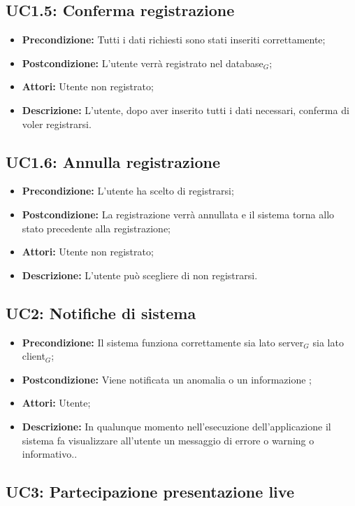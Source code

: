 \subsection{ UC1.5: Conferma registrazione}

\begin{itemize}
	\item \textbf{Precondizione:} Tutti i dati richiesti sono stati inseriti correttamente;
	\item \textbf{Postcondizione:} L'utente verrà registrato nel database$_G$;
	\item \textbf{Attori:} Utente non registrato;
	\item \textbf{Descrizione:} L'utente, dopo aver inserito tutti i dati necessari,  conferma di voler registrarsi.
\end{itemize}
\subsection{ UC1.6: Annulla registrazione}

\begin{itemize}
	\item \textbf{Precondizione:} L'utente ha scelto di registrarsi;
	\item \textbf{Postcondizione:} La registrazione verrà annullata e il sistema torna allo stato precedente alla registrazione;
	\item \textbf{Attori:} Utente non registrato;
	\item \textbf{Descrizione:} L'utente può scegliere di non registrarsi.
\end{itemize}
\subsection{ UC2: Notifiche di sistema}

\begin{itemize}
	\item \textbf{Precondizione:} Il sistema funziona correttamente sia lato server$_G$ sia lato client$_G$;
	\item \textbf{Postcondizione:} Viene notificata un anomalia o un informazione ;
	\item \textbf{Attori:} Utente;
	\item \textbf{Descrizione:} In qualunque momento nell'esecuzione dell'applicazione il sistema fa visualizzare all'utente un messaggio di errore o warning o informativo..
\end{itemize}
\subsection{ UC3: Partecipazione presentazione live}

